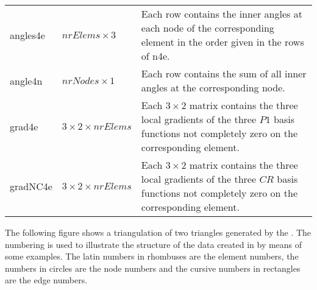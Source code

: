 \begin{longtable}{p{}p{}p{}}
angles4e&$nrElems \times 3$&Each row contains the inner angles at each node of the corresponding element 
in the order given in the rows of n4e.\\
angle4n&$nrNodes \times 1$&Each row contains the sum of all inner angles at the corresponding node.\\
grad4e&$3 \times 2 \times nrElems$&Each $3\times2$ matrix contains the three local gradients of the three $P1$ 
basis functions not completely zero on the corresponding element.\\
gradNC4e&$3 \times 2 \times nrElems$&Each $3\times2$ matrix contains the three local gradients of the three $CR$ 
basis functions not completely zero on the corresponding element.\\
\end{longtable}


The following figure shows a triangulation of two triangles generated by the \FFW. The numbering is used to illustrate the
structure of the data created in  by means of some examples. The latin numbers in rhombuses are the element numbers, the numbers in circles are the node numbers and the cursive numbers in rectangles are the edge numbers.

